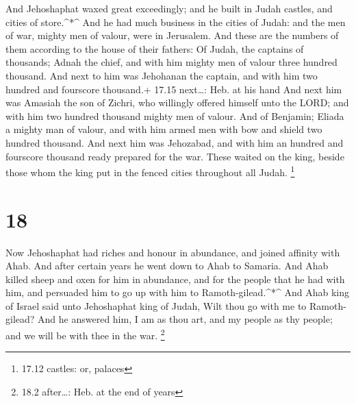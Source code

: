  And Jehoshaphat waxed great exceedingly; and he built in
Judah castles, and cities of store.\^{}*\^{}  And he had
much business in the cities of Judah: and the men of war, mighty men of
valour, were in Jerusalem.  And these are the numbers of
them according to the house of their fathers: Of Judah, the captains of
thousands; Adnah the chief, and with him mighty men of valour three
hundred thousand.  And next to him was Jehohanan the
captain, and with him two hundred and fourscore thousand.+ 17.15
next\ldots: Heb. at his hand  And next him was Amasiah the
son of Zichri, who willingly offered himself unto the LORD; and with him
two hundred thousand mighty men of valour.  And of
Benjamin; Eliada a mighty man of valour, and with him armed men with bow
and shield two hundred thousand.  And next him was
Jehozabad, and with him an hundred and fourscore thousand ready prepared
for the war.  These waited on the king, beside those whom
the king put in the fenced cities throughout all Judah. \footnote{17.12
  castles: or, palaces}

\hypertarget{section-17}{%
\section{18}\label{section-17}}

 Now Jehoshaphat had riches and honour in abundance, and
joined affinity with Ahab.  And after certain years he went
down to Ahab to Samaria. And Ahab killed sheep and oxen for him in
abundance, and for the people that he had with him, and persuaded him to
go up with him to Ramoth-gilead.\^{}*\^{}  And Ahab king of
Israel said unto Jehoshaphat king of Judah, Wilt thou go with me to
Ramoth-gilead? And he answered him, I am as thou art, and my people as
thy people; and we will be with thee in the war. \footnote{18.2
  after\ldots: Heb. at the end of years}

